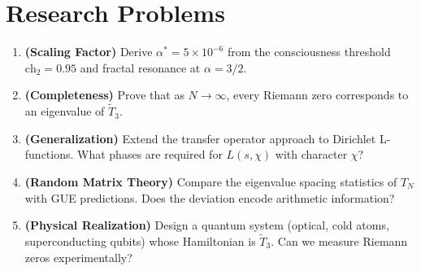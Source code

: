 \section*{Research Problems}

\begin{enumerate}
\item \textbf{(Scaling Factor)} Derive $\alpha^* = 5 \times 10^{-6}$ from the consciousness threshold $\text{ch}_2 = 0.95$ and fractal resonance at $\alpha = 3/2$.

\item \textbf{(Completeness)} Prove that as $N \to \infty$, every Riemann zero corresponds to an eigenvalue of $\tilde{T}_3$.

\item \textbf{(Generalization)} Extend the transfer operator approach to Dirichlet L-functions. What phases are required for $L(s, \chi)$ with character $\chi$?

\item \textbf{(Random Matrix Theory)} Compare the eigenvalue spacing statistics of $T_N$ with GUE predictions. Does the deviation encode arithmetic information?

\item \textbf{(Physical Realization)} Design a quantum system (optical, cold atoms, superconducting qubits) whose Hamiltonian is $\tilde{T}_3$. Can we measure Riemann zeros experimentally?
\end{enumerate}
